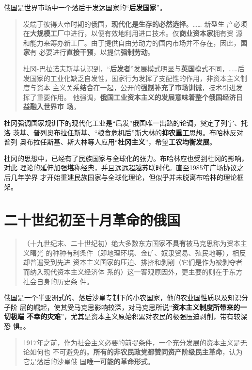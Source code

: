 俄国是世界市场中一个落后于发达国家的“\textbf{后发国家}”。
\begin{quotation}
  发端于彼得大帝时期的俄国，\textbf{现代化是生存的必然选择}。…… 新型生
  产必须在\textbf{大规模工厂}中进行，以便有效地利用进口技术。仅\textbf{商业资本家}拥有资
  源和能力来筹办新工厂。由于提供自由劳动力的国内市场并不存在，因此，\textbf{国家}有
  必要进行\textbf{直接干预}，以提供\textbf{强制劳动}。

  杜冈-巴拉诺夫斯基认识到，“\textbf{后发者}”发展模式明显与\textbf{英国}模式不同，……后
  发国家的工业化缺乏自发性，国家行为发挥了支配性的作用，非资本主义制度与资本
  主义关系\textbf{结合}在一起，公开的\textbf{强制补充了市场训诫}，技术引进发挥了重要作用。
  他强调，\textbf{俄国工业资本主义的发展意味着整个俄国经济日益融入世界市
    场}。
\end{quotation}

杜冈强调国家规训下的现代化工业是“后发”俄国唯一出路的论调，奠定了列宁、托洛
茨基、普列奥布拉任斯基、“粮食危机后”斯大林的\textbf{抑农重工}思想。布哈林反对普列
奥布拉任斯基、斯大林等人应用“\textbf{杜冈主义}”，希望\textbf{工农均衡发展}。

杜冈的思想中，已经有了民族国家与全球化的张力。布哈林应也受到杜冈的影响，对此
理论的延伸加强堪称经典，并且远远超越苏联时代。直至1985年广场协议之后几年学界
才开始重建民族国家与全球化理论，但似乎并未脱离布哈林的理论框架。

\section{二十世纪初至十月革命的俄国}

\begin{quotation}
  （十九世纪末、二十世纪初）绝大多数东方国家\textbf{不具有}被马克思称为资本主义曙光
  的种种有利条件（即地理环境、金矿、奴隶贸易、殖民地等），相反却普遍受到先进
  资本主义国家的压迫、排挤和剥削（它们是作为被剥夺者而纳入现代资本主义经济体
  系的）这一客观原因外，更主要的则在于东方社会自身的历史条
  件。
\end{quotation}

俄国是一个半亚洲式的、落后沙皇专制下的小农国家，他的农业国性质以及知识分子阶
层的崛起，使其受马克思影响较深，对马克思所说“\textbf{资本主义制度所带来的一切极端
  不幸的灾难}”，尤其是资本主义原始积累对农民的极强压迫剥削，带有较深恐
惧。。

\begin{quotation}
  1917年之前，作为社会主义必要的前提条件，一个充分发展的资本主义是无论如何也
  不可避免的。\textbf{所有的非农民政党都赞同资产阶级民主革命}，认为它是落后的沙皇俄
  国\textbf{唯一可能的革命形式}。
\end{quotation}


